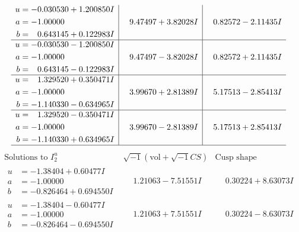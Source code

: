 \documentclass[1p]{elsarticle_modified}
\theoremstyle{definition}
\newcommand{\I}{\sqrt{-1}}
\begin{document}
$$\begin{array}{c|c|c}
\begin{aligned}
u &= -0.030530 + 1.200850 I \\
a &= -1.00000\phantom{ +0.000000I} \\
b &= \phantom{-}0.643145 + 0.122983 I\end{aligned}
 & \phantom{-}9.47497 + 3.82028 I & \phantom{-}0.82572 - 2.11435 I \\ \hline\begin{aligned}
u &= -0.030530 - 1.200850 I \\
a &= -1.00000\phantom{ +0.000000I} \\
b &= \phantom{-}0.643145 - 0.122983 I\end{aligned}
 & \phantom{-}9.47497 - 3.82028 I & \phantom{-}0.82572 + 2.11435 I \\ \hline\begin{aligned}
u &= \phantom{-}1.329520 + 0.350471 I \\
a &= -1.00000\phantom{ +0.000000I} \\
b &= -1.140330 - 0.634965 I\end{aligned}
 & \phantom{-}3.99670 + 2.81389 I & \phantom{-}5.17513 - 2.85413 I \\ \hline\begin{aligned}
u &= \phantom{-}1.329520 - 0.350471 I \\
a &= -1.00000\phantom{ +0.000000I} \\
b &= -1.140330 + 0.634965 I\end{aligned}
 & \phantom{-}3.99670 - 2.81389 I & \phantom{-}5.17513 + 2.85413 I\\
 \hline 
 \end{array}$$\newpage$$\begin{array}{c|c|c}  
\text{Solutions to }I^u_{2}& \I (\text{vol} + \sqrt{-1}CS) & \text{Cusp shape}\\
 \hline 
\begin{aligned}
u &= -1.38404 + 0.60477 I \\
a &= -1.00000\phantom{ +0.000000I} \\
b &= -0.826464 + 0.694550 I\end{aligned}
 & \phantom{-}1.21063 - 7.51551 I & \phantom{-}0.30224 + 8.63073 I \\ \hline\begin{aligned}
u &= -1.38404 - 0.60477 I \\
a &= -1.00000\phantom{ +0.000000I} \\
b &= -0.826464 - 0.694550 I\end{aligned}
 & \phantom{-}1.21063 + 7.51551 I & \phantom{-}0.30224 - 8.63073 I \\ \hline\begin{aligned}

\end{aligned}
\end{array}$$
\end{document}
